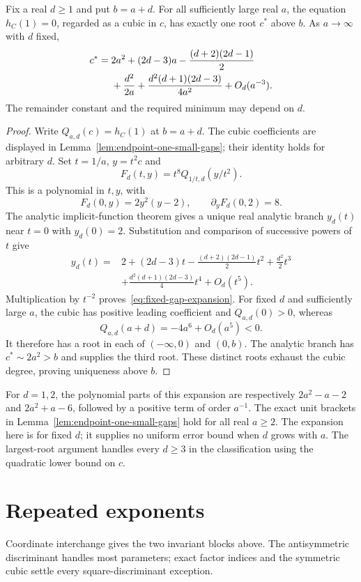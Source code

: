 \begin{proposition}
\label{prop:fixed-gap-expansion}
Fix a real $d\geq1$ and put $b=a+d$. For all sufficiently large real
$a$, the equation $h_C(1)=0$, regarded as a cubic in $c$, has exactly
one root $c^*$ above $b$. As $a\to\infty$ with $d$ fixed,
\begin{align}
 c^*={}&2a^2+(2d-3)a-\frac{(d+2)(2d-1)}2
 \notag\\
 &+\frac{d^2}{2a}
 +\frac{d^2(d+1)(2d-3)}{4a^2}+O_d(a^{-3}).
 \label{eq:fixed-gap-expansion}
\end{align}
The remainder constant and the required minimum may depend on $d$.
\end{proposition}
\begin{proof}
Write $Q_{a,d}(c)=h_C(1)$ at $b=a+d$. The cubic coefficients are
displayed in Lemma~\ref{lem:endpoint-one-small-gaps}; their identity
holds for arbitrary $d$. Set $t=1/a$, $y=t^2c$ and
\[
 F_d(t,y)=t^8Q_{1/t,d}(y/t^2).
\]
This is a polynomial in $t,y$, with
\[
 F_d(0,y)=2y^2(y-2),\qquad
 \partial_yF_d(0,2)=8.
\]
The analytic implicit-function theorem gives a unique real analytic
branch $y_d(t)$ near $t=0$ with $y_d(0)=2$. Substitution and comparison
of successive powers of $t$ give
\begin{align*}
 y_d(t)={}&2+(2d-3)t-\frac{(d+2)(2d-1)}2t^2
 +\frac{d^2}{2}t^3\\
 &+\frac{d^2(d+1)(2d-3)}4t^4+O_d(t^5).
\end{align*}
Multiplication by $t^{-2}$ proves~\eqref{eq:fixed-gap-expansion}.
For fixed $d$ and sufficiently large $a$, the cubic has positive
leading coefficient and $Q_{a,d}(0)>0$, whereas
\[
 Q_{a,d}(a+d)=-4a^6+O_d(a^5)<0.
\]
It therefore has a root in each of $(-\infty,0)$ and $(0,b)$.
The analytic branch has $c^*\sim2a^2>b$ and supplies the third root.
These distinct roots exhaust the cubic degree, proving uniqueness
above $b$.
\end{proof}

For $d=1,2$, the polynomial parts of this expansion are respectively
$2a^2-a-2$ and $2a^2+a-6$, followed by a positive term of order
$a^{-1}$. The exact unit brackets in
Lemma~\ref{lem:endpoint-one-small-gaps} hold for all real $a\geq2$.
The expansion here is for fixed $d$; it supplies no uniform error bound
when $d$ grows with $a$. The largest-root argument handles every
$d\geq3$ in the classification using the quadratic lower bound on $c$.
\section{Repeated exponents}
\label{sec:bounds}
\label{sec:completion}
Coordinate interchange gives the two invariant blocks above. The
antisymmetric discriminant handles most parameters; exact factor indices
and the symmetric cubic settle every square-discriminant exception.


